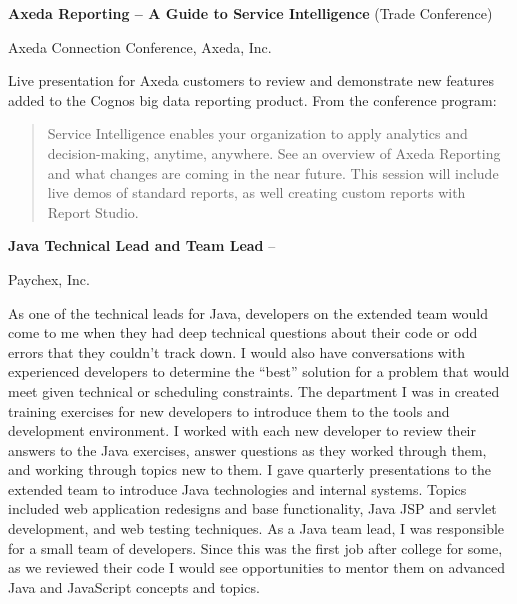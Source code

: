 \documentclass[MMMMyyyy,nonstopmode]{simpleresumecv_stacked}
\begin{document}
\begin{Body}
\BigGap
\Entry
\textbf{Axeda Reporting -- A Guide to Service Intelligence} (Trade Conference)
\hfill
{}

Axeda Connection Conference, Axeda, Inc.
\begin{Detail}
\Item
Live presentation for Axeda customers to review and demonstrate new features added to the Cognos big data reporting product.
\ifB
\Item
From the conference program:
\begin{quote}
Service Intelligence enables your organization to apply analytics and decision-making, anytime, anywhere. See an overview of Axeda Reporting and what changes are coming in the near future. This session will include live demos of standard reports, as well creating custom reports with Report Studio.
\end{quote}
\fi
\end{Detail}

\ifC      %
\BigGap
\Entry
\textbf{Java Technical Lead and Team Lead}
\hfill
{} -- 

Paychex, Inc.
\begin{Detail}
\BulletItem
As one of the technical leads for Java, developers on the extended team would come to me when they had deep technical questions about their code or odd errors that they couldn't track down. I would also have conversations with experienced developers to determine the ``best'' solution for a problem that would meet given technical or scheduling constraints.
\BulletItem
The department I was in created training exercises for new developers to introduce them to the tools and development environment. I worked with each new developer to review their answers to the Java exercises,  answer questions as they worked through them, and working through topics new to them.
\BulletItem
I gave quarterly presentations to the extended team to introduce Java technologies and internal systems. Topics included web application redesigns and base functionality, Java JSP and servlet development, and web testing techniques.
\BulletItem
As a Java team lead, I was responsible for a small team of developers. Since this was the first job after college for some, as we reviewed their code I would see opportunities to mentor them on advanced Java and JavaScript concepts and topics.
\end{Detail}
\fi      %

\fi %

\iffalse %


\end{Body}
\end{document}
